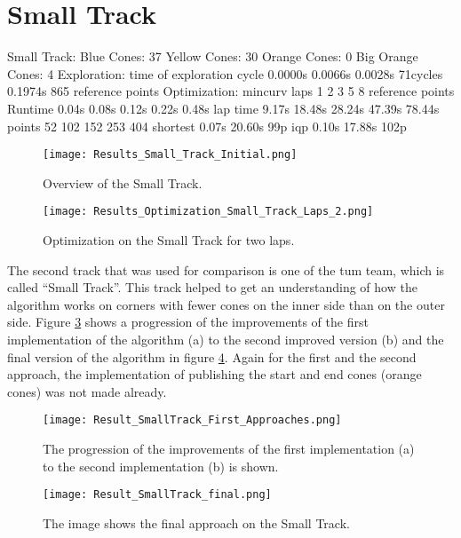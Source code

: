 \section{Small Track} \label{sec:Results Small Track}
Small Track:
Blue Cones: 37
Yellow Cones: 30
Orange Cones: 0
Big Orange Cones: 4
Exploration:
time of exploration cycle
0.0000s 0.0066s 0.0028s 71cycles 0.1974s
865 reference points
Optimization:
mincurv laps 1 2 3 5 8
reference points
Runtime 0.04s 0.08s 0.12s 0.22s 0.48s
lap time 9.17s 18.48s 28.24s 47.39s 78.44s
points 52 102 152 253 404
shortest 0.07s 20.60s 99p
iqp 0.10s 17.88s 102p

\begin{figure}[H]
    \centering
    \texttt{[image: Results\_Small\_Track\_Initial.png]}
    \caption{Overview of the Small Track.}
    \label{fig:Results Small Track Initial}
\end{figure}

\begin{figure}[H]
    \centering
    \texttt{[image: Results\_Optimization\_Small\_Track\_Laps\_2.png]}
    \caption{Optimization on the Small Track for two laps.}
    \label{fig:Results Small Track Laps 2}
\end{figure}

The second track that was used for comparison is one of the \acrlong{tum} team, which is called ``Small Track''. \cite{tumftm_optimization_algoritm} This track helped to get an understanding of how the algorithm works on corners with fewer cones on the inner side than on the outer side. Figure \ref{fig:Result Small Track First Approaches} shows a progression of the improvements of the first implementation of the algorithm (a) to the second improved version (b) and the final version of the algorithm in figure \ref{fig:Result Small Track Final}. Again for the first and the second approach, the implementation of publishing the start and end cones (orange cones) was not made already.
\begin{figure}[H]
    \centering
    \texttt{[image: Result\_SmallTrack\_First\_Approaches.png]}
    \caption{The progression of the improvements of the first implementation (a) to the second implementation (b) is shown.}
    \label{fig:Result Small Track First Approaches}
\end{figure}
\begin{figure}[H]
    \centering
    \texttt{[image: Result\_SmallTrack\_final.png]}
    \caption{The image shows the final approach on the Small Track.}
    \label{fig:Result Small Track Final}
\end{figure}

